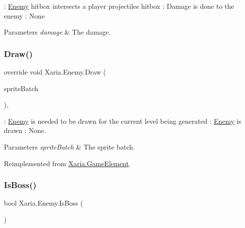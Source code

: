 \+: \hyperlink{classXaria_1_1Enemy}{Enemy} hitbox intersects a player projectile\textquotesingle{}s hitbox \+: Damage is done to the enemy \+: None 


\begin{DoxyParams}{Parameters}
{\em damage} & The damage.\\
\hline
\end{DoxyParams}
\mbox{\label{classXaria_1_1Enemy_a0f857a720f4a5ecc037887c846c55afc}} 
\subsubsection{\texorpdfstring{Draw()}{Draw()}}
{\footnotesize\ttfamily override void Xaria.\+Enemy.\+Draw (\begin{DoxyParamCaption}\item[{ref Sprite\+Batch}]{sprite\+Batch }\end{DoxyParamCaption})\hspace{0.3cm}{\ttfamily [inline]}, {\ttfamily [virtual]}}



\+: \hyperlink{classXaria_1_1Enemy}{Enemy} is needed to be drawn for the current level being generated \+: \hyperlink{classXaria_1_1Enemy}{Enemy} is drawn \+: None. 


\begin{DoxyParams}{Parameters}
{\em sprite\+Batch} & The sprite batch.\\
\hline
\end{DoxyParams}


Reimplemented from \hyperlink{classXaria_1_1GameElement_a812e0ffbe54519a3fb14a49115bf43d9}{Xaria.\+Game\+Element}.

\mbox{\label{classXaria_1_1Enemy_a809f1adcc325a17d07f6cc3cd74e7139}} 
\subsubsection{\texorpdfstring{Is\+Boss()}{IsBoss()}}
{\footnotesize\ttfamily bool Xaria.\+Enemy.\+Is\+Boss (\begin{DoxyParamCaption}{ }\end{DoxyParamCaption})\hspace{0.3cm}{\ttfamily [inline]}}



